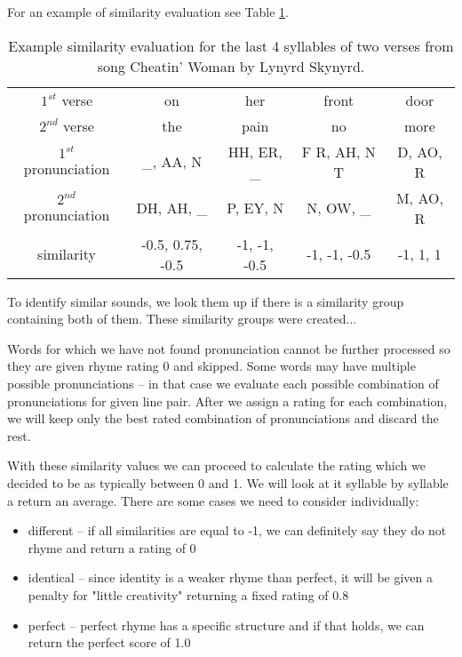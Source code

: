 For an example of similarity evaluation see Table \ref{similarity_eval_table}.

\begin{table}[h!]
	\centering
	\begin{tabular}{c | c c c c} 
		$1^{st}$ verse & on & her & front & door \\ [0.5ex] 
		$2^{nd}$ verse & the & pain & no & more \\ 
		\hline
		$1^{st}$ pronunciation & \_, AA, N & HH, ER, \_ & F R, AH, N T & D, AO, R \\
		$2^{nd}$ pronunciation & DH, AH, \_ & P, EY, N & N, OW, \_ & M, AO, R \\
		\hline
		similarity & -0.5, 0.75, -0.5 & -1, -1, -0.5 & -1, -1, -0.5 & -1, 1, 1 \\
	\end{tabular}
	\caption{Example similarity evaluation for the last 4 syllables of two verses from song Cheatin' Woman by Lynyrd Skynyrd.}
	\label{similarity_eval_table}
\end{table}

To identify similar sounds, we look them up if there is a similarity group containing both of them. These similarity groups were created... 

Words for which we have not found pronunciation cannot be further processed so they are given rhyme rating 0 and skipped. Some words may have multiple possible pronunciations -- in that case we evaluate each possible combination of pronunciations for given line pair. After we assign a rating for each combination, we will keep only the best rated combination of pronunciations and discard the rest. 


With these similarity values we can proceed to calculate the rating which we decided to be as typically between 0 and 1. We will look at it syllable by syllable a return an average. There are some cases we need to consider individually:

\begin{itemize}
	\item different -- if all similarities are equal to -1, we can definitely say they do not rhyme and return a rating of 0
	\item identical -- since identity is a weaker rhyme than perfect, it will be given a penalty for "little creativity" returning a fixed rating of 0.8
	\item perfect -- perfect rhyme has a specific structure and if that holds, we can return the perfect score of 1.0 
\end{itemize}

